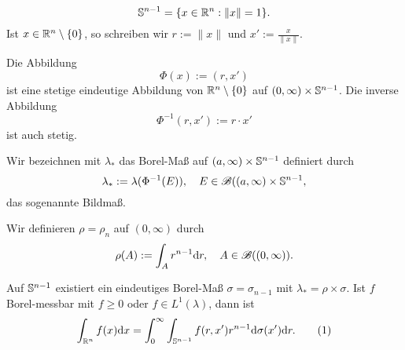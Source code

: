 \begin{deno}
  \[ \mathbb{S}^{n-1} = \{ x \in \mathbb{R}^n : \| x \| = 1 \}. \]
  Ist $x \in \mathbb{R}^n \setminus \{0\}$, so schreiben wir $r := \|x\|$ und $x' :=
  \frac{x}{\|x\|}$.

  Die Abbildung
  \[ \Phi(x) := (r,x') \]
  ist eine stetige eindeutige Abbildung von $\mathbb{R}^n\setminus\{0\}$ auf
  $(0,\infty) \times \mathbb{S}^{n-1}$. Die inverse Abbildung
  \[ \Phi^{-1}(r, x') := r \cdot x' \]
  ist auch stetig.

  Wir bezeichnen mit $\lambda_*$ das Borel-Maß auf $(a,\infty)
  \times \mathbb{S}^{n-1}$ definiert durch
  \[ \lambda_* := \lambda(\Phi^{-1}(E)), \quad E \in \mathscr{B}((a,\infty) \times
    \mathbb{S}^{n-1},\]
  das sogenannte Bildmaß.

  Wir definieren $\rho = \rho_n$ auf $(0,\infty)$ durch
  \[ \rho(A) := \int_A r^{n-1} \mathrm{d} r, \quad A \in \mathscr{B}((0,\infty)). \]
\end{deno}

\begin{thm}
  Auf $\mathbb{S}^{n-1}$ existiert ein eindeutiges Borel-Maß $\sigma = \sigma_{n-1}$
  mit $\lambda_* = \rho \times \sigma$. Ist $f$ Borel-messbar mit $f \ge 0$ oder
  $f \in L^1(\lambda)$, dann ist
  \[ \int_{\mathbb{R}^n} f(x) \mathrm{d} x =  \int_0^\infty \int_{\mathbb{S}^{n-1}}
    f(r,x') r^{n-1} \mathrm{d} \sigma(x') \mathrm{d} r. \tag{1} \]
\end{thm}

